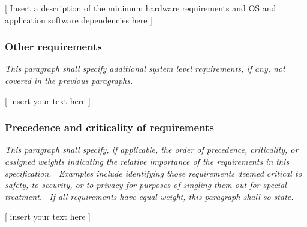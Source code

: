 \documentclass[twoside,letterpaper]{article}
\begin{document}
{[ Insert a description of the minimum hardware requirements and OS and application software dependencies here ]}


\subsubsection[Other requirements]{\rmfamily\bfseries\color{black} Other requirements}
\hypertarget{RefHeading20059017292}{}{\itshape\color{black}
This paragraph shall specify additional system level requirements, if any, not covered in the previous paragraphs.}

{\color{black}
[ insert your text here ]}

\subsubsection[Precedence and criticality of requirements]{\rmfamily\bfseries\color{black}
Precedence and criticality of requirements}
\hypertarget{RefHeading20259017292}{}{\itshape\color{black}
This paragraph shall specify, if applicable, the order of precedence, criticality, or assigned weights indicating the
relative importance of the requirements in this specification. \ Examples include identifying those requirements deemed
critical to safety, to security, or to privacy for purposes of singling them out for special treatment. \ If all
requirements have equal weight, this paragraph shall so state. }

{\color{black}
[ insert your text here ]}
\end{document}
